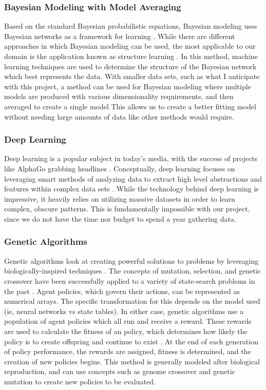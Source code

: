 \documentclass[draftclsnofoot,onecolumn,letterpaper,10pt]{IEEEtran}
\begin{document}
\subsubsection{Bayesian Modeling with Model Averaging}
Based on the standard Bayesian probabilistic equations, Bayesian modeling uses Bayesian networks as a framework for learning \cite{RussellNorvig}.
While there are different approaches in which Bayesian modeling can be used, the most applicable to our domain is the application known as structure learning \cite{RussellNorvig}.
In this method, machine learning techniques are used to determine the structure of the Bayesian network which best represents the data.
With smaller data sets, such as what I anticipate with this project, a method can be used for Bayesian modeling where multiple models are produced with various dimensionality requirements, and then averaged to create a single model \cite{RussellNorvig}
This allows us to create a better fitting model without needing large amounts of data like other methods would require.

\subsubsection{Deep Learning}
Deep learning is a popular subject in today's media, with the success of projects like AlphaGo grabbing headlines \cite{alphago}.
Conceptually, deep learning focuses on leveraging smart methods of analyzing data to extract high level abstractions and features within complex data sets \cite{Goodfellow-et-al-2016-Book}.
While the technology behind deep learning is impressive, it heavily relies on utilizing massive datasets in order to learn complex, obscure patterns.
This is fundamentally impossible with our project, since we do not have the time nor budget to spend a year gathering data.

\subsubsection{Genetic Algorithms}
Genetic algorithms look at creating powerful solutions to problems by leveraging biologically-inspired techniques \cite{RussellNorvig}.
The concepts of mutation, selection, and genetic crossover have been successfully applied to a variety of state-search problems in the past \cite{RussellNorvig}.
Agent policies, which govern their actions, can be represented as numerical arrays.
The specific transformation for this depends on the model used (ie, neural networks vs state tables).
In either case, genetic algorithms use a population of agent policies which all run and receive a reward.
These rewards are used to calculate the fitness of an policy, which determines how likely the policy is to create offspring and continue to exist \cite{RussellNorvig}.
At the end of each generation of policy performance, the rewards are assigned, fitness is determined, and the creation of new policies begins.
This method is generally modeled after biological reproduction, and can use concepts such as genome crossover and genetic mutation to create new policies to be evaluated.
\end{document}
